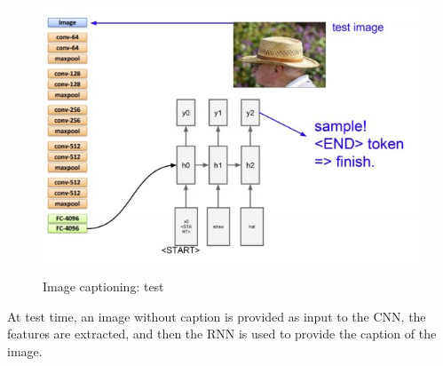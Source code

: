 \begin{figure}[h!]
		\centering
        \includegraphics[scale = 1.5]{img/image captioning 2.jpg}
		\label{mi}
        \caption{Image captioning: test}
\end{figure}

At test time, an image without caption is provided as input to the CNN, the features are extracted, and then the RNN is used to provide the caption of the image.
